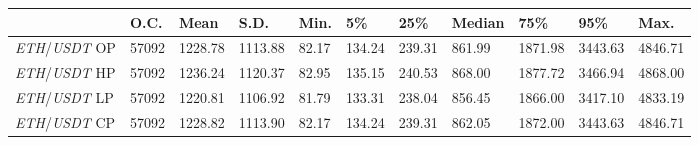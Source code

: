 \begin{tabular}{lllllllllll}
\toprule
 & \textbf{O.C.} & \textbf{Mean} & \textbf{S.D.} & \textbf{Min.} & \textbf{5\%} & \textbf{25\%} & \textbf{Median} & \textbf{75\%} & \textbf{95\%} & \textbf{Max.} \\
\midrule
\emph{ETH}/\emph{USDT} OP & 57092 & 1228.78 & 1113.88 & 82.17 & 134.24 & 239.31 & 861.99 & 1871.98 & 3443.63 & 4846.71 \\
\emph{ETH}/\emph{USDT} HP & 57092 & 1236.24 & 1120.37 & 82.95 & 135.15 & 240.53 & 868.00 & 1877.72 & 3466.94 & 4868.00 \\
\emph{ETH}/\emph{USDT} LP & 57092 & 1220.81 & 1106.92 & 81.79 & 133.31 & 238.04 & 856.45 & 1866.00 & 3417.10 & 4833.19 \\
\emph{ETH}/\emph{USDT} CP & 57092 & 1228.82 & 1113.90 & 82.17 & 134.24 & 239.31 & 862.05 & 1872.00 & 3443.63 & 4846.71 \\
\bottomrule
\end{tabular}
